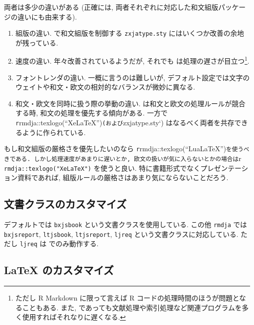 \documentclass[
]{bxjsbook}
\providecommand{\tightlist}{%
  \setlength{\itemsep}{0pt}\setlength{\parskip}{0pt}}
\theoremstyle{definition}
\theoremstyle{definition}
\theoremstyle{definition}
\theoremstyle{remark}
\begin{document}
両者は多少の違いがある (正確には,
両者それぞれに対応した和文組版パッケージの違いにも由来する).

\begin{enumerate}
\def\labelenumi{\arabic{enumi}.}
\tightlist
\item
  組版の違い. \XeLaTeX で和文組版を制御する \texttt{zxjatype.sty}
  にはいくつか改善の余地が残っている.
\item
  速度の違い. 年々改善されているようだが, それでも
  \LuaLaTeX は処理の遅さが目立つ\footnote{ただし R Markdown
    に限って言えば R コードの処理時間のほうが問題となることもある. また,
    \XeLaTeX であっても文献処理や索引処理など関連プログラムを多く使用すればそれなりに遅くなる.}.
\item
  フォントレンダの違い. 一概に言うのは難しいが,
  デフォルト設定では文字のウェイトや和文・欧文の相対的なバランスが微妙に異なる.
\item
  和文・欧文を同時に扱う際の挙動の違い.
  \LuaLaTeX は和文と欧文の処理ルールが競合する時,
  和文の処理を優先する傾向がある. 一方で
  \texttt{r}rmdja::texlogo(``XeLaTeX'')\texttt{(および}zxjatype.sty`)
  はなるべく両者を共存できるように作られている.
\end{enumerate}

もし和文組版の厳格さを優先したいのなら
\texttt{r}rmdja::texlogo(``LuaLaTeX'')\texttt{を使うべきである.\ しかし処理速度があまりに遅いとか,\ 欧文の扱いが気に入らないとかの場合は}r
\texttt{rmdja::texlogo("XeLaTeX")} を使うと良い.
特に書籍形式でなくプレゼンテーション資料であれば,
組版ルールの厳格さはあまり気にならないことだろう.

\hypertarget{ux6587ux66f8ux30afux30e9ux30b9ux306eux30abux30b9ux30bfux30deux30a4ux30ba}{%
\subsection{文書クラスのカスタマイズ}\label{ux6587ux66f8ux30afux30e9ux30b9ux306eux30abux30b9ux30bfux30deux30a4ux30ba}}

デフォルトでは \texttt{bxjsbook} という文書クラスを使用している. この他
\texttt{rmdja} では \texttt{bxjsreport}, \texttt{ltjsbook},
\texttt{ltjsreport}, \texttt{ljreq} という文書クラスに対応している.
ただし \texttt{ljreq} は \LuaLaTeX でのみ動作する.

\hypertarget{latex-ux306eux30abux30b9ux30bfux30deux30a4ux30ba}{%
\subsection{LaTeX
のカスタマイズ}\label{latex-ux306eux30abux30b9ux30bfux30deux30a4ux30ba}}
\end{document}
